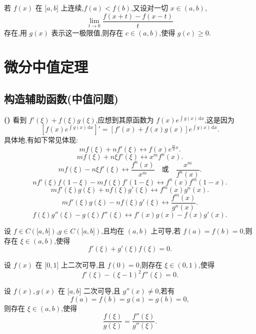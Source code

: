 \documentclass[../数学分析培优讲义.tex]{subfiles}
\begin{document}
\begin{example}
若 $f(x)$ 在 $\lbrack a,b\rbrack$ 上连续,$f(a)<f(b)$,又设对一切 $x\in(a,b)$,
\[
    \lim\limits_{t\to0}\dfrac{f(x+t)-f(x-t)}{t}
\]
存在,用 $g(x)$ 表示这一极限值,则存在 $c\in(a,b)$,使得 $g(c)\geq0$.
\end{example}
\exampleblank


\newpage

\section{微分中值定理}


\subsection{构造辅助函数(中值问题)}

\noindent\textbf{(\markstar)} 看到 $f'(\xi)+f(\xi)g(\xi)$,应想到其原函数为
$\displaystyle f(x)e^{\int g(x)\,\mathrm{d}x}$,这是因为
\[
    \left[f(x)e^{\int g(x)\,\mathrm{d}x}\right]'
    =[f'(x)+f(x)g(x)]e^{\int g(x)\,\mathrm{d}x}.
\]
具体地,有如下常见体现:
\[
    mf(\xi)+nf'(\xi)
    \longleftrightarrow
    f(x)e^{\frac{m}{n}x}.
\]
\[
    mf(\xi)+n\xi f'(\xi)
    \longleftrightarrow
    x^m f^n(x).
\]
\[
    mf(\xi)-n\xi f'(\xi)
    \longleftrightarrow
    \dfrac{f^n(x)}{x^m}
    \quad\text{或}\quad
    \dfrac{x^m}{f^n(x)}.
\]
\[
    nf'(\xi)f(1-\xi)-mf(\xi)f'(1-\xi)
    \longleftrightarrow
    f^n(x)f^m(1-x).
\]
\[
    mf'(\xi)g(\xi)+nf(\xi)g'(\xi)
    \longleftrightarrow
    f^m(x)g^n(x).
\]
\[
    mf'(\xi)g(\xi)-nf(\xi)g'(\xi)
    \longleftrightarrow
    \dfrac{f^m(x)}{g^n(x)}.
\]
\[
    f(\xi)g''(\xi)-g(\xi)f''(\xi)
    \longleftrightarrow
    f'(x)g(x)-f(x)g'(x).
\]

\begin{example}
设 $f\in C(\lbrack a,b\rbrack)$,$g\in C(\lbrack a,b\rbrack)$,且均在 $(a,b)$ 上可导,若 $f(a)=f(b)=0$,则存在 $\xi\in(a,b)$,使得
\[
    f'(\xi)+g'(\xi)f(\xi)=0.
\]
\end{example}
\exampleblank

\begin{example}
设 $f(x)$ 在 $\lbrack 0,1\rbrack$ 上二次可导,且 $f(0)=0$,则存在 $\xi\in(0,1)$,使得
\[
    f'(\xi)-(\xi-1)^2f''(\xi)=0.
\]
\end{example}
\exampleblank

\begin{example}
设 $f(x),g(x)$ 在 $\lbrack a,b\rbrack$ 二次可导,且 $g''(x)\neq0$,若有
\[
    f(a)=f(b)=g(a)=g(b)=0,
\]
则存在 $\xi\in(a,b)$,使得
\[
    \dfrac{f(\xi)}{g(\xi)}=\dfrac{f''(\xi)}{g''(\xi)}.
\]
\end{example}
\exampleblank
\end{document}

